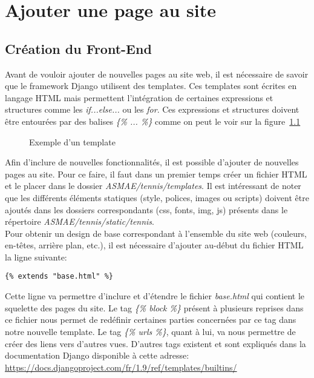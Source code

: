 \chapter{Ajouter une page au site}

\section{Création du Front-End}

Avant de vouloir ajouter de nouvelles pages au site web, il est nécessaire de savoir que le framework Django utilisent des templates. Ces templates sont écrites en langage HTML mais permettent l'intégration de certaines expressions et structures comme les \textit{if...else...} ou les \textit{for}. Ces expressions et structures doivent être entourées par des balises \textit{\{\% ... \%\}} comme on peut le voir sur la figure~\ref{fig:Exemple d'un template}\\

\begin{figure}[!ht]
\centering
\begin{framed}

\end{framed}
\caption{Exemple d'un template}
\label{fig:Exemple d'un template}
\end{figure}
\FloatBarrier

Afin d'inclure de nouvelles fonctionnalités, il est possible d'ajouter de nouvelles pages au site. Pour ce faire, il faut dans un premier temps créer un fichier HTML et le placer dans le dossier \textit{ASMAE/tennis/templates}. Il est intéressant de noter que les différents éléments statiques (style, polices, images ou scripts) doivent être ajoutés dans les dossiers correspondants (css, fonts, img, js)  présents dans le répertoire \textit{ASMAE/tennis/static/tennis}.\\

Pour obtenir un design de base correspondant à l'ensemble du site web (couleurs, en-têtes, arrière plan, etc.), il est nécessaire d'ajouter au-début du fichier HTML la ligne suivante:

\begin{verbatim}
{% extends "base.html" %}
\end{verbatim}

Cette ligne va permettre d'inclure et d'étendre le fichier \textit{base.html} qui contient le squelette des pages du site. Le tag \textit{\{\% block \%\}} présent à plusieurs reprises dans ce fichier nous permet de redéfinir certaines parties concernées par ce tag dans notre nouvelle template. Le tag \textit{\{\% urls \%\}}, quant à lui, va nous permettre de créer des liens vers d'autres vues. D'autres tags existent et sont expliqués dans la documentation Django disponible à cette adresse: \url{https://docs.djangoproject.com/fr/1.9/ref/templates/builtins/}

